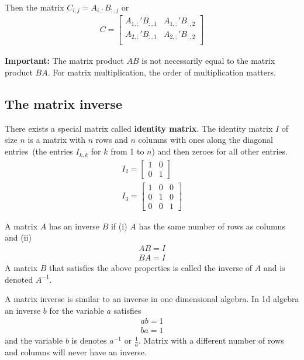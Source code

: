 Then the matrix $C_{i,j} = A_{i,:} B_{:,j}$ or 
\begin{align}
    C = \begin{bmatrix}
           A_{1,:}' B_{:,1} & A_{1,:}' B_{:,2} \\ 
           A_{2,:}' B_{:,1} & A_{2,:}' B_{:,2} \\ 
        \end{bmatrix}
\end{align}

\textbf{Important:} The matrix product $AB$ is not necessarily equal to the matrix product $BA$. For matrix multiplication, the order of multiplication matters.

\subsection{The matrix inverse}

There exists a special matrix called \textbf{identity matrix}. 
The identity matrix $I$ of size $n$ is a matrix with $n$ rows and $n$ columns with ones along the diagonal entries~(the entries $I_{k,k}$ for $k$ from 1 to $n$) and then zeroes for all other entries.   
\begin{align}
    I_{2} = \begin{bmatrix}
        1 & 0 \\ 
        0 & 1 
    \end{bmatrix}\\
    I_{3} = \begin{bmatrix}
        1 & 0 & 0 \\ 
        0 & 1 & 0 \\ 
        0 & 0 & 1  
    \end{bmatrix}
\end{align}

A matrix $A$ has an inverse $B$ if (i) $A$ has the same number of rows as columns and (ii)
\begin{align}
    AB = I \\ 
    BA = I
\end{align}
A matrix $B$ that satisfies the above properties is called the inverse of $A$ and is denoted $A^{-1}$.

A matrix inverse is similar to an inverse in one dimensional algebra. In 1d algebra an inverse $b$ for the variable $a$ satisfies
\begin{align}
    ab = 1 \\ 
    ba = 1 
\end{align}
and the variable $b$ is denotes $a^{-1}$ or $\frac{1}{a}$. 
Matrix with a different number of rows and columns will never have an inverse.


